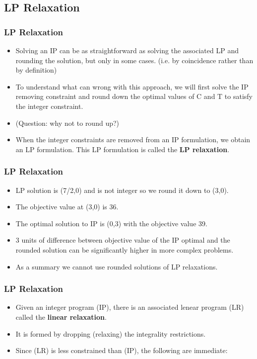 \documentclass{beamer}
\begin{document}
\subsection{LP Relaxation}
\begin{frame}
\frametitle{LP Relaxation}
\large
\begin{itemize}
\item 
Solving an IP can be as straightforward as solving the associated LP
and rounding the solution, but only in some cases. (i.e. by coincidence rather than by definition)
\item To understand what can wrong with this approach, we will first solve the IP
removing constraint and round down  the optimal values of C and T to satisfy
the integer constraint. 
\item (Question: why not to round up?)
\item When the integer constraints are removed from an IP formulation, we obtain an LP formulation. This
LP formulation is called the \textbf{LP relaxation}.
\end{itemize}
\end{frame}
\begin{frame}
	\frametitle{LP Relaxation}
	\begin{itemize}
\item LP solution is (7/2,0) and is not integer so we round it down to (3,0). 
\item The objective value at (3,0) is
36. 
\item The optimal solution to IP is (0,3) with the objective value 39. 
\item 3 units of difference between objective
value of the IP optimal and the rounded solution can be significantly higher in more complex problems.
\item As
a summary we cannot use rounded solutions of LP relaxations.
	\end{itemize}
\end{frame}
\begin{frame}
\frametitle{LP Relaxation}
\begin{itemize}
\item Given an integer program (IP), there is an associated lenear program (LR)
called the \textbf{linear relaxation}. 
\item It is formed by dropping (relaxing) the integrality
restrictions. 
\item Since (LR) is less constrained than (IP), the following are immediate:
\end{itemize}

\end{frame}
\end{document}
